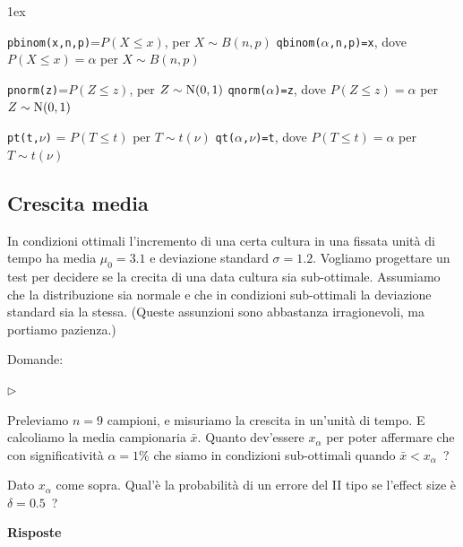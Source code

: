 \documentclass[11pt,openany]{book}
\newcommand{\mylabel}[1]{{\footnotesize\textsf{#1}}\hfill}
\renewenvironment{itemize}
  {\begin{list}{$\triangleright$}{%
   \setlength{\parskip}{0mm}
   \setlength{\topsep}{.2\baselineskip}
   \setlength{\rightmargin}{0mm}
   \setlength{\listparindent}{0mm}
   \setlength{\itemindent}{0mm}
   \setlength{\labelwidth}{3ex}
   \setlength{\itemsep}{.4\baselineskip}
   \setlength{\parsep}{0mm}
   \setlength{\partopsep}{0mm}
   \setlength{\labelsep}{1ex}
   \setlength{\leftmargin}{\labelwidth+\labelsep}
   \let\makelabel\mylabel}}{%
   \end{list}\vspace*{-1.3mm}}
\begin{document}
\vfill
\parskip1ex
{\hrulefill\scriptsize

{\tt pbinom(x,n,p)}=$P(X\le x)$, per $X\sim B(n,p)$
\hfill 
{\tt qbinom($\alpha$,n,p)=x},  dove $P(X\le x)=\alpha$ per $X\sim B(n,p)$

{\tt pnorm(z)}=$P(Z\le z)$, per $Z\sim {\rm N}(0,1)$
\hfill 
{\tt qnorm($\alpha$)=z},  dove $P(Z\le z)=\alpha$ per $Z\sim {\rm N}(0,1)$

{\tt pt(t,$\nu$)} = $P(T\le t)$ per $T\sim t(\nu)$
\hfill
{\tt qt($\alpha$,$\nu$)=t}, dove $P(T\le t)=\alpha$ per $T\sim t(\nu)$

}

\clearpage\subsection{Crescita media}

In condizioni ottimali l'incremento di una certa cultura in una fissata unità di tempo ha media $\mu_0=3.1$ e deviazione standard $\sigma=1.2$. Vogliamo progettare un test per decidere se la crecita di una data cultura sia sub-ottimale. Assumiamo che la distribuzione sia normale e che in condizioni sub-ottimali la deviazione standard sia la stessa. (Queste assunzioni sono abbastanza irragionevoli, ma portiamo pazienza.)

Domande:

\begin{itemize}
\item[1] Preleviamo $n=9$ campioni, e misuriamo la crescita in un'unità di tempo. E calcoliamo la media campionaria $\bar x$. Quanto dev'essere $x_\alpha$ per poter affermare che con significatività $\alpha=1\%$ che siamo in condizioni sub-ottimali quando $\bar x<x_\alpha$~?
\item[2] Dato $x_\alpha$ come sopra. Qual'è la probabilità di un errore del II tipo se l'effect size è $\delta=0.5$~?
\end{itemize}

\textbf{Risposte}

\end{document}
